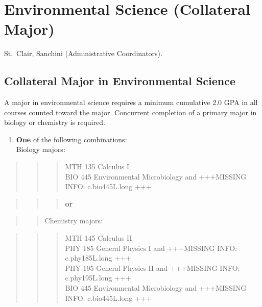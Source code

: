 \documentclass[
  letterpaper,
]{scrbook}
\providecommand{\tightlist}{%
  \setlength{\itemsep}{0pt}\setlength{\parskip}{0pt}}
\begin{document}
\section{Environmental Science (Collateral
Major)}\label{sec-environmental-science}

St.~Clair, Sanchini (Administrative Coordinators).

\subsection{Collateral Major in Environmental
Science}\label{collateral-major-in-environmental-science}

A major in environmental science requires a minimum cumulative 2.0 GPA
in all courses counted toward the major. Concurrent completion of a
primary major in biology or chemistry is required.

\begin{enumerate}
\def\labelenumi{\arabic{enumi}.}
\tightlist
\item
  \textbf{One} of the following combinations:\\
  Biology majors:
\end{enumerate}

\begin{quote}
\begin{quote}
\begin{quote}
MTH 135 Calculus I\\
BIO 445 Environmental Microbiology and +++MISSING INFO: c.bio445L.long
+++
\end{quote}
\end{quote}
\end{quote}

\begin{quote}
\begin{quote}
\begin{quote}
\textbf{or}
\end{quote}
\end{quote}
\end{quote}

\begin{quote}
\begin{quote}
Chemistry majors:
\end{quote}
\end{quote}

\begin{quote}
\begin{quote}
\begin{quote}
MTH 145 Calculus II\\
PHY 185 General Physics I and +++MISSING INFO: c.phy185L.long +++\\
PHY 195 General Physics II and +++MISSING INFO: c.phy195L.long +++\\
BIO 445 Environmental Microbiology and +++MISSING INFO: c.bio445L.long
+++
\end{quote}
\end{quote}
\end{quote}
\end{document}
